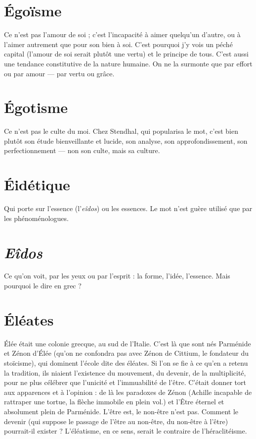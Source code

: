 \section{Égoïsme}
Ce n’est pas l'amour de soi ; c’est l’incapacité à aimer quelqu'un
d'autre, ou à l’aimer autrement que pour son bien à soi. C’est
pourquoi j'y vois un péché capital (l’amour de soi serait plutôt une vertu) et le
principe de tous.
C’est aussi une tendance constitutive de la nature humaine. On ne la surmonte
que par effort ou par amour — par vertu ou grâce.

\section{Égotisme}
Ce n’est pas le culte du moi. Chez Stendhal, qui popularisa le
mot, c'est bien plutôt son étude bienveillante et lucide, son
analyse, son approfondissement, son perfectionnement — non son culte, mais sa
culture.

\section{Éidétique}
Qui porte sur l’essence (l’{\it eîdos}) ou les essences. Le mot n’est
guère utilisé que par les phénoménologues.

\section{\it Eîdos}
Ce qu’on voit, par les yeux ou par l'esprit : la forme, l’idée, l'essence.
Mais pourquoi le dire en grec ?

\section{Éléates}
Élée était une colonie grecque, au sud de l'Italie. C’est là que sont
nés Parménide et Zénon d’Élée (qu’on ne confondra pas avec
Zénon de Cittium, le fondateur du stoïcisme), qui dominent l’école dite des
éléates. Si l’on se fie à ce qu’en a retenu la tradition, ils niaient l'existence du
mouvement, du devenir, de la multiplicité, pour ne plus célébrer que
l'unicité et l’immuabilité de l’être. C’était donner tort aux apparences et à
l'opinion : de là les paradoxes de Zénon (Achille incapable de rattraper une
tortue, la flèche immobile en plein vol.) et l’Être éternel et absolument plein
de Parménide. L’être est, le non-être n’est pas. Comment le devenir (qui suppose
le passage de l'être au non-être, du non-être à l’être) pourrait-il exister ?
L’éléatisme, en ce sens, serait le contraire de l’héraclitéisme.

